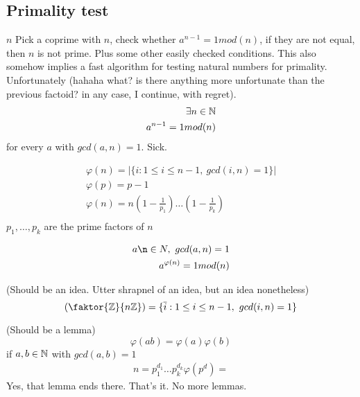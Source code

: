 \documentclass[../notes.tex]{subfiles}
\begin{document}
\subsection{Primality test}
$n$ Pick a coprime with $n$, check whether $a^{n-1}=1mod(n)$,
if they are not equal, then $n$ is not prime. Plus some other easily checked
conditions. This also somehow implies a fast algorithm for testing natural
numbers for primality.\\
Unfortunately (hahaha what? is there anything more unfortunate than the
previous factoid? in any case, I continue, with regret).
\begin{align*}
    \exists n\in \mathbb{N}\\
    a^{n-1}=1mod(n)\\
\end{align*}
for every $a$ with $gcd(a,n)=1$. Sick.\\
\begin{definition}
    \begin{align*}
        \varphi(n)=|\{i:1\leq i\leq n-1,\ gcd(i,n)=1\}|\\
        \varphi(p)=p-1\\
        \varphi(n)=
        n(1-\frac{1}{p_1}) \dots (1-\frac{1}{p_k})\\
    \end{align*}
    $p_1,\dots,p_k$ are the prime factors of $n$
\end{definition}
\begin{theorem}
    \begin{align*}
        a\n\in N,\ gcd(a,n)=1\\
        a^{\varphi(n)}=1mod(n)\\
    \end{align*}
\end{theorem}
\begin{proposition}
    (Should be an idea. Utter shrapnel of an idea, but an idea nonetheless)
    \[
        (\faktor{\Z}{n\Z})=\{\overline{i}: 1\leq i\leq n-1,\ gcd(i,n)=1\}
    \]
\end{proposition}
\begin{theorem}
    (Should be a lemma)\\
    \[
        \varphi(ab)=\varphi(a)\varphi(b)
    \]
    if $a,b\in \mathbb{N}$ with $gcd(a,b)=1$
    \begin{align*}
        n=p_1^{d_1}\dots p_k^{d_k}
        \varphi(p^d)=
    \end{align*}
    Yes, that lemma ends there. That's it. No more lemmas.
\end{theorem}
\end{document}
